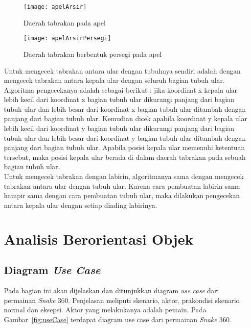 \begin{figure}[H]
	\centering  
	\texttt{[image: apelArsir]}  
	\caption[Daerah tabrakan pada apel]{Daerah tabrakan pada apel}
	\label{fig:apelArsir} 
\end{figure}

\begin{figure}[H]
	\centering  
	\texttt{[image: apelArsirPersegi]}  
	\caption[Daerah tabrakan berbentuk persegi pada apel]{Daerah tabrakan berbentuk persegi pada apel}
	\label{fig:apelArsirPersegi} 
\end{figure}

Untuk mengecek tabrakan antara ular dengan tubuhnya sendiri adalah dengan mengecek tabrakan antara kepala ular dengan seluruh bagian tubuh ular. Algoritma pengecekanya adalah sebagai berikut : jika koordinat x kepala ular lebih kecil dari koordinat x bagian tubuh ular dikurangi panjang dari bagian tubuh ular dan lebih besar dari koordinat x bagian tubuh ular ditambah dengan panjang dari bagian tubuh ular. Kemudian dicek apabila koordinat y kepala ular lebih kecil dari koordinat y bagian tubuh ular dikurangi panjang dari bagian tubuh ular dan lebih besar dari koordinat y bagian tubuh ular ditambah dengan panjang dari bagian tubuh ular. Apabila posisi kepala ular memenuhi ketentuan tersebut, maka posisi kepala ular berada di dalam daerah tabrakan pada sebuah bagian tubuh ular. \\

Untuk mengecek tabrakan dengan labirin, algoritmanya sama dengan mengecek tabrakan antara ular dengan tubuh ular. Karena cara pembuatan labirin sama hampir sama dengan cara pembuatan tubuh ular, maka dilakukan pengecekan antara kepala ular dengan setiap dinding labirinya.

\section{Analisis Berorientasi Objek}

\subsection{Diagram \textit{Use Case}}
Pada bagian ini akan dijelaskan dan ditunjukkan diagram \textit{use case} dari permainan \textit{Snake} 360. Penjelasan meliputi skenario, aktor, prakondisi skenario normal dan eksepsi. Aktor yang melakukanya adalah pemain. Pada Gambar~\ref{fig:useCase} terdapat diagram use case dari permainan \textit{Snake} 360.

